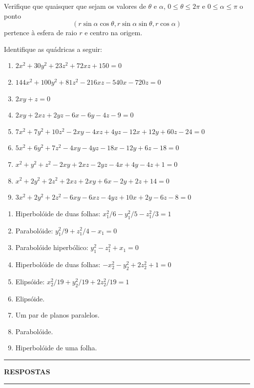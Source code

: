 \documentclass[12pt]{exam}
\begin{document}
    \begin{exercicio}
        Verifique que quaisquer que sejam os valores de $\theta$ e $\alpha$, $0 \le \theta \le 2\pi$ e $0 \le \alpha \le \pi$ o ponto
        \[
        (r\sin\alpha\cos\theta, r\sin\alpha\sin\theta, r\cos\alpha)
        \]
        pertence à esfera de raio $r$ e centro na origem.
    \end{exercicio}

    \begin{exercicio}
        Identifique as quádricas a seguir:
        \begin{enumerate}[label=({\alph*})]
            \item $2x^2 + 30y^2 + 23z^2 + 72xz + 150 = 0$
            \item $144x^2 + 100y^2 + 81z^2 - 216 xz - 540x - 720z = 0$
            \item $2xy + z = 0$
            \item $2xy + 2xz + 2yz - 6x - 6y - 4z - 9 = 0$
            \item $7x^2 + 7y^2 + 10z^2 - 2xy - 4xz + 4yz - 12x + 12y + 60z - 24 = 0$
            \item $5x^2 + 6y^2 + 7z^2 - 4xy - 4yz - 18x - 12y + 6z - 18 = 0$
            \item $x^2 + y^2 + z^2 - 2xy + 2xz - 2yz - 4x + 4y - 4z + 1 = 0$
            \item $x^2 + 2y^2 + 2z^2 + 2xz + 2xy + 6x - 2y + 2z + 14 = 0$
            \item $3x^2 + 2y^2 + 2z^2 - 6xy - 6xz - 4yz + 10x + 2y - 6z - 8 = 0$
        \end{enumerate}
        \begin{solucao}
            \begin{enumerate}[label=({\alph*})]
                \item Hiperbolóide de duas folhas: $x_1^2/6 - y_1^2/5 - z_1^2/3 = 1$
                \item Parabolóide: $y_1^2/9 + z_1^2/4 - x_1 = 0$
                \item Parabolóide hiperbólico: $y_1^2 - z_1^2 + x_1 = 0$
                \item Hiperbolóide de duas folhas: $-x_2^2 - y_2^2 + 2z_2^2 + 1 = 0$
                \item Elipsóide: $x_2^2/19 + y_2^2/19 + 2z_2^2/19 = 1$
                \item Elipsóide.
                \item Um par de planos paralelos.
                \item Parabolóide.
                \item Hiperbolóide de uma folha.
            \end{enumerate}
        \end{solucao}
    \end{exercicio}

    \newpage
    \hrule
    \begin{center}
        {\large\bf RESPOSTAS}
    \end{center}
    \hrule
    
\end{document}
